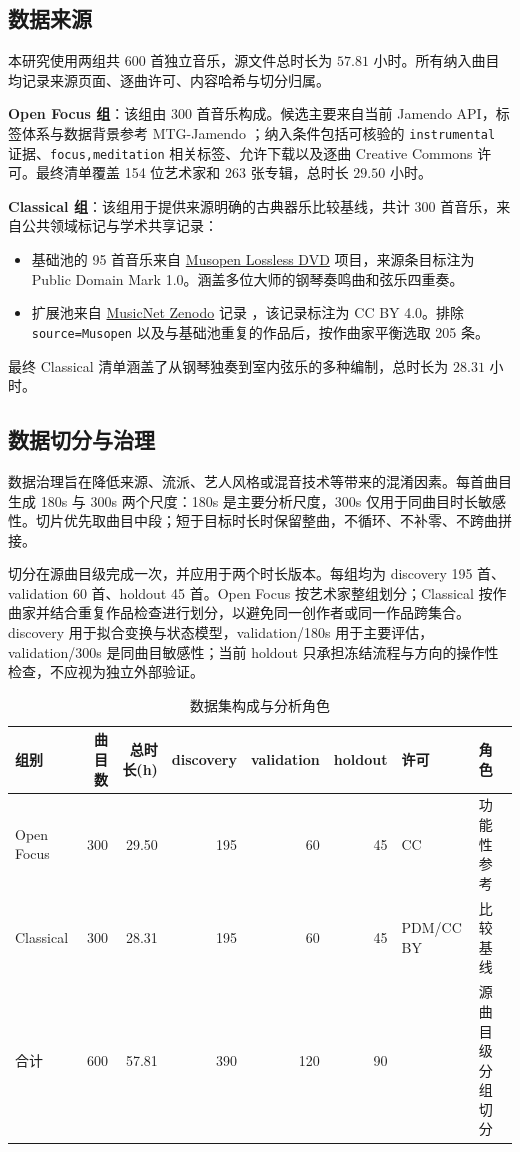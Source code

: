 \documentclass{article}
\begin{document}
\subsection{数据来源}

本研究使用两组共 600 首独立音乐，源文件总时长为 $57.81$ 小时。所有纳入曲目均记录来源页面、逐曲许可、内容哈希与切分归属。

\textbf{Open Focus 组}：该组由 300 首音乐构成。候选主要来自当前 Jamendo API，标签体系与数据背景参考 MTG-Jamendo \cite{bogdanov2019mtg}；纳入条件包括可核验的 \verb|instrumental| 证据、\verb|focus,meditation| 相关标签、允许下载以及逐曲 Creative Commons 许可。最终清单覆盖 154 位艺术家和 263 张专辑，总时长 $29.50$ 小时。

\textbf{Classical 组}：该组用于提供来源明确的古典器乐比较基线，共计 300 首音乐，来自公共领域标记与学术共享记录：
\begin{itemize}
  \item 基础池的 95 首音乐来自 \href{https://archive.org/details/musopen-lossless-dvd}{Musopen Lossless DVD} 项目，来源条目标注为 Public Domain Mark 1.0。涵盖多位大师的钢琴奏鸣曲和弦乐四重奏。
  \item 扩展池来自 \href{https://doi.org/10.5281/zenodo.5120004}{MusicNet Zenodo} 记录 \cite{john_thickstun_2016_5120004}，该记录标注为 CC BY 4.0。排除 \verb|source=Musopen| 以及与基础池重复的作品后，按作曲家平衡选取 205 条。
\end{itemize}
最终 Classical 清单涵盖了从钢琴独奏到室内弦乐的多种编制，总时长为 $28.31$ 小时。

\subsection{数据切分与治理}

数据治理旨在降低来源、流派、艺人风格或混音技术等带来的混淆因素。每首曲目生成 180s 与 300s 两个尺度：180s 是主要分析尺度，300s 仅用于同曲目时长敏感性。切片优先取曲目中段；短于目标时长时保留整曲，不循环、不补零、不跨曲拼接。

切分在源曲目级完成一次，并应用于两个时长版本。每组均为 discovery 195 首、validation 60 首、holdout 45 首。Open Focus 按艺术家整组划分；Classical 按作曲家并结合重复作品检查进行划分，以避免同一创作者或同一作品跨集合。discovery 用于拟合变换与状态模型，validation/180s 用于主要评估，validation/300s 是同曲目敏感性；当前 holdout 只承担冻结流程与方向的操作性检查，不应视为独立外部验证。

\begin{table}[h]
\centering
\caption{数据集构成与分析角色}
\label{tab:dataset}
\begin{tabular}{lrrrrrll}
\toprule
组别 & 曲目数 & 总时长(h) & discovery & validation & holdout & 许可 & 角色 \\
\midrule
Open Focus & 300 & 29.50 & 195 & 60 & 45 & CC & 功能性参考 \\
Classical  & 300 & 28.31 & 195 & 60 & 45 & PDM/CC BY & 比较基线 \\
\midrule
合计       & 600 & 57.81 & 390 & 120 & 90 &  & 源曲目级分组切分 \\
\bottomrule
\end{tabular}
\end{table}
\end{document}
